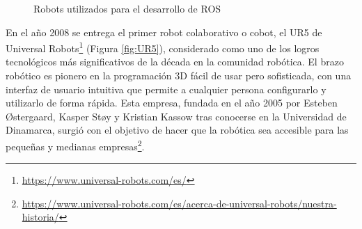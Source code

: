   \begin{figure}[H]
    \begin{center}
      \subcapcentertrue
      \hspace{2mm}
    \end{center}
    \caption{Robots utilizados para el desarrollo de ROS}
    \label{fig:PR_ROS}
  \end{figure}
    
En el año 2008 se entrega el primer robot colaborativo o cobot, el UR5 de Universal Robots\footnote{\url{https://www.universal-robots.com/es/}} (Figura \ref{fig:UR5}), considerado como uno de los logros tecnológicos más significativos de la década en la comunidad robótica. El brazo robótico es pionero en la programación 3D fácil de usar pero sofisticada, con una interfaz de usuario intuitiva que permite a cualquier persona configurarlo y utilizarlo de forma rápida. Esta empresa, fundada en el año 2005 por Esteben Østergaard, Kasper Støy y Kristian Kassow tras conocerse en la Universidad de Dinamarca, surgió con el objetivo de hacer que la robótica sea accesible para las pequeñas y medianas empresas\footnote{\url{https://www.universal-robots.com/es/acerca-de-universal-robots/nuestra-historia/}}.\\
  
